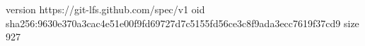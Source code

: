 version https://git-lfs.github.com/spec/v1
oid sha256:9630e370a3cac4e51e00f9fd69727d7c5155fd56ce3c8f9ada3ecc7619f37cd9
size 927
